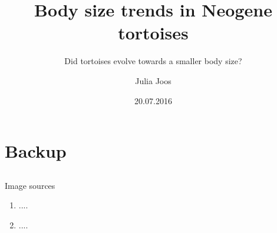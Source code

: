 \documentclass{beamer} %
\title{Body size trends in Neogene tortoises}
\subtitle{\small Did tortoises evolve towards a smaller body size?}
\author{Julia Joos}
\institute[OS]{Humboldt-Universität zu Berlin}
\date{20.07.2016}
\begin{document}

\begin{frame}[plain]
	\setcounter{framenumber}{0}
	\titlepage
\end{frame}






%






\appendix
\section[]{Backup}
\subsection[]{}

\begin{frame}[noframenumbering]{Image sources}%
\begin{footnotesize}
\begin{enumerate}
\item ....
\item ....
\end{enumerate}
\end{footnotesize}
\end{frame}

\setcounter{finalframe}{\value{framenumber}}
\end{document}
